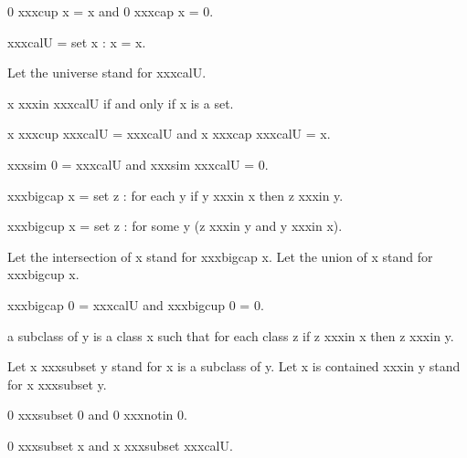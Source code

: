 \documentclass[a4paper,draft]{amsproc}
\begin{document}
{\begin{forthel}
\begin{theorem}[17]
0 xxxcup x = x and 0 xxxcap x = 0.
\end{theorem}

\begin{definition}[18]
	xxxcal{U} = {set x : x = x}.
\end{definition}
Let the universe stand for xxxcal{U}.

\begin{theorem}[19]
x xxxin xxxcal{U} if and only if x is a set.
\end{theorem}

\begin{theorem}[20]
x xxxcup xxxcal{U} = xxxcal{U} and x xxxcap xxxcal{U} = x.
\end{theorem}

\begin{theorem}[21]
xxxsim 0 = xxxcal{U} and xxxsim xxxcal{U} = 0.
\end{theorem}

\begin{definition}[22] xxxbigcap x = 
{set z : for each y if y xxxin x then z xxxin y}.\end{definition}

\begin{definition}[23] xxxbigcup x = 
{set z : for some y (z xxxin y and y xxxin x)}.\end{definition}

Let the intersection of x stand for xxxbigcap x.
Let the union of x stand for xxxbigcup x.

\begin{theorem}[24]
xxxbigcap 0 = xxxcal{U} and xxxbigcup 0 = 0.
\end{theorem}

\begin{definition}[25]
a subclass of y is a class x such that 
for each class z if z xxxin x then z xxxin y.
\end{definition}

Let x xxxsubset y stand for x is a subclass of y.
Let x is contained xxxin y stand for x xxxsubset y.

\begin{lemma}
0 xxxsubset 0 and 0 xxxnotin 0.
\end{lemma}

\begin{theorem}[26]
0 xxxsubset x and x xxxsubset xxxcal{U}.
\end{theorem}


\end{forthel}}
\end{document}
